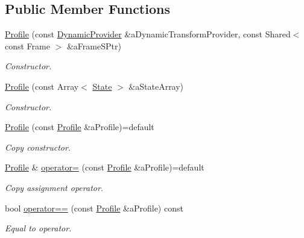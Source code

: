 \subsection*{Public Member Functions}
\begin{DoxyCompactItemize}
\item 
\hyperlink{classostk_1_1astro_1_1flight_1_1_profile_a80fbc6a3773a6f2790b84c4ddb306d07}{Profile} (const \hyperlink{namespaceostk_1_1astro_1_1flight_a30fb17f0f77e97e4d6bb5567218816bd}{Dynamic\+Provider} \&a\+Dynamic\+Transform\+Provider, const Shared$<$ const Frame $>$ \&a\+Frame\+S\+Ptr)
\begin{DoxyCompactList}\small\item\em Constructor. \end{DoxyCompactList}\item 
\hyperlink{classostk_1_1astro_1_1flight_1_1_profile_a3f4520bfcc4b3c1c89438aa487397eff}{Profile} (const Array$<$ \hyperlink{classostk_1_1astro_1_1flight_1_1profile_1_1_state}{State} $>$ \&a\+State\+Array)
\begin{DoxyCompactList}\small\item\em Constructor. \end{DoxyCompactList}\item 
\hyperlink{classostk_1_1astro_1_1flight_1_1_profile_abe183d12e41b513da461cd8a7d5067e8}{Profile} (const \hyperlink{classostk_1_1astro_1_1flight_1_1_profile}{Profile} \&a\+Profile)=default
\begin{DoxyCompactList}\small\item\em Copy constructor. \end{DoxyCompactList}\item 
\hyperlink{classostk_1_1astro_1_1flight_1_1_profile}{Profile} \& \hyperlink{classostk_1_1astro_1_1flight_1_1_profile_a34d5912842eafdfbd59d906cad969e00}{operator=} (const \hyperlink{classostk_1_1astro_1_1flight_1_1_profile}{Profile} \&a\+Profile)=default
\begin{DoxyCompactList}\small\item\em Copy assignment operator. \end{DoxyCompactList}\item 
bool \hyperlink{classostk_1_1astro_1_1flight_1_1_profile_a46b1c71a5a58ddf87f82b073ec651ea6}{operator==} (const \hyperlink{classostk_1_1astro_1_1flight_1_1_profile}{Profile} \&a\+Profile) const
\begin{DoxyCompactList}\small\item\em Equal to operator. \end{DoxyCompactList}\item 

\end{DoxyCompactItemize}

